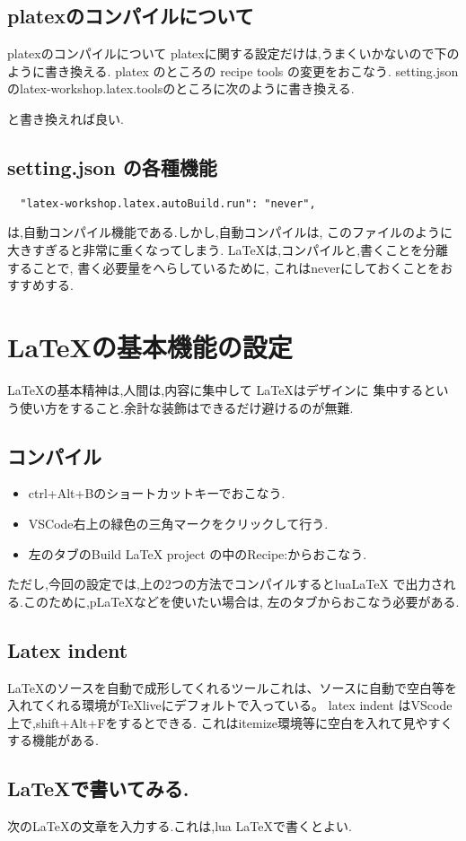 \documentclass{ltjsarticle}
\begin{document}
\subsection{platexのコンパイルについて}
platexのコンパイルについて
platexに関する設定だけは,うまくいかないので下のように書き換える.
platex のところの
recipe tools の変更をおこなう.
setting.jsonのlatex-workshop.latex.toolsのところに次のように書き換える.

と書き換えれば良い.
\subsection{setting.json の各種機能}
\begin{verbatim}
  "latex-workshop.latex.autoBuild.run": "never",
\end{verbatim}
は,自動コンパイル機能である.しかし,自動コンパイルは,
このファイルのように大きすぎると非常に重くなってしまう.
\LaTeX は,コンパイルと,書くことを分離することで,
書く必要量をへらしているために,
これはneverにしておくことをおすすめする.


\section{\LaTeX の基本機能の設定}
\LaTeX の基本精神は,人間は,内容に集中して \LaTeX はデザインに
集中するという使い方をすること.余計な装飾はできるだけ避けるのが無難.
\subsection{コンパイル}
\begin{itemize}
  \item ctrl+Alt+Bのショートカットキーでおこなう.
  \item VSCode右上の緑色の三角マークをクリックして行う.
  \item 左のタブのBuild LaTeX project の中のRecipe:からおこなう.
\end{itemize}
ただし,今回の設定では,上の2つの方法でコンパイルするとlua\LaTeX
で出力される.このために,pLaTeXなどを使いたい場合は,
左のタブからおこなう必要がある.
\subsection{Latex indent}
LaTeXのソースを自動で成形してくれるツールこれは、ソースに自動で空白等を
入れてくれる環境がTeXliveにデフォルトで入っている。
latex indent はVScode上で,shift+Alt+Fをするとできる.
これはitemize環境等に空白を入れて見やすくする機能がある.
\subsection{\LaTeX で書いてみる.}
次の\LaTeX の文章を入力する.これは,lua \LaTeX で書くとよい.
\end{document}
